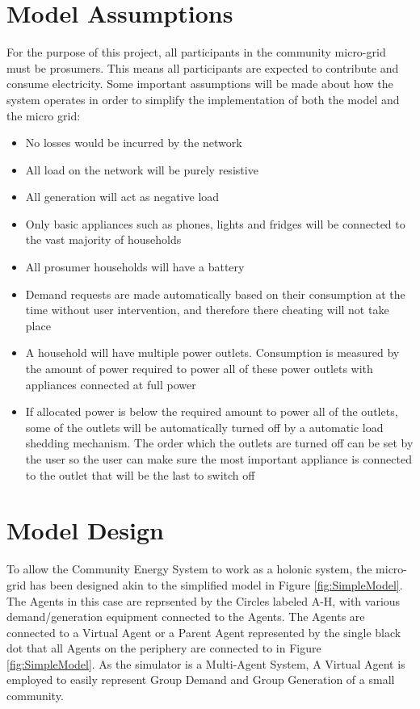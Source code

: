\section*{Model Assumptions}
For the purpose of this project, all participants in the community micro-grid must be prosumers. This means all participants are expected to contribute and consume electricity. Some important assumptions will be made about how the system operates in order to simplify the implementation of both the model and the micro grid:
\begin{itemize}
	\item No losses would be incurred by the network
	\item All load on the network will be purely resistive
	\item All generation will act as negative load
	\item Only basic appliances such as phones, lights and fridges will be connected to the vast majority of households 
	\item All prosumer households will have a battery
	\item Demand requests are made automatically based on their consumption at the time without user intervention, and therefore there cheating will not take place
	\item A household will have multiple power outlets. Consumption is measured by the amount of power required to power all of these power outlets with appliances connected at full power
	\item If allocated power is below the required amount to power all of the outlets, some of the outlets will be automatically turned off by a automatic load shedding mechanism. The order which the outlets are turned off can be set by the user so the user can make sure the most important appliance is connected to the outlet that will be the last to switch off
\end{itemize}

\section*{Model Design}
To allow the Community Energy System to work as a holonic system, the micro-grid has been designed akin to the simplified model in Figure \ref{fig:SimpleModel}. The Agents in this case are reprsented by the Circles labeled A-H, with various demand/generation equipment connected to the Agents. The Agents are connected to a Virtual Agent or a Parent Agent represented by the single black dot that all Agents on the periphery are connected to in Figure \ref{fig:SimpleModel}. As the simulator is a Multi-Agent System, A Virtual Agent is employed to easily represent Group Demand and Group Generation of a small community.

